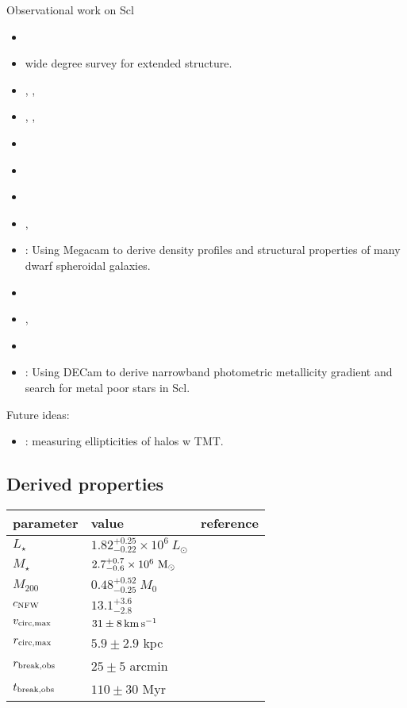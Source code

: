 Observational work on Scl

\begin{itemize}
\tightlist
\item
  \citet{sestito+2023a}
\item
  \citet{westfall+2006} wide degree survey for extended structure.
\item
  \citet{tolstoy+2023}, \citet{arroyo-polonio+2023},
  \citet{arroyo-polonio+2024}
\item
  \citet{eskridge1988}, \citet{eskridge1988a}, \citet{eskridge1988b}
\item
  \citet{coleman+dacosta+bland-hawthorn2005}
\item
  \citet{DQ1994}
\item
  \citet{WMO2009}
\item
  \citet{IH1995},
\item
  \citet{munoz+2018}: Using Megacam to derive density profiles and
  structural properties of many dwarf spheroidal galaxies.
\item
  \citet{kirby+2009}
\item
  \citet{martinez-vazquez+2015}, \citet{pietrzynski+2008}
\item
  \citet{grebel1996}
\item
  \citet{barbosa+2025}: Using DECam to derive narrowband photometric
  metallicity gradient and search for metal poor stars in Scl.
\end{itemize}

Future ideas:

\begin{itemize}
\tightlist
\item
  \citet{evslin2016}: measuring ellipticities of halos w TMT.
\end{itemize}

\subsection{Derived properties}\label{derived-properties}

\begin{table*}[t]
\centering
\begin{tabular}{lll}
\toprule
parameter & value & reference\\
\midrule
$L_\star$ & $1.82_{-0.22}^{+0.25}\times10^6\ L_\odot$ & \\
$M_\star$ & $2.7_{-0.6}^{+0.7} \times10^6\ {\rm M}_\odot$ & \\
$M_{200}$ & $0.48_{-0.25}^{+0.52}\ M_0$ & \\
$c_{\rm NFW}$ & $13.1_{-2.8}^{+3.6}$ & \\
$v_{\rm circ, max}$ & $31\pm8\,{\rm km\,s^{-1}}$ & \\
$r_{\rm circ, max}$ & $5.9 \pm 2.9$ kpc & \\
$r_{\rm break, obs}$ & $25 \pm 5$ arcmin & \\
$t_{\rm break, obs}$ & $110\pm30$ Myr & \\
\bottomrule
\end{tabular}
\end{table*}

